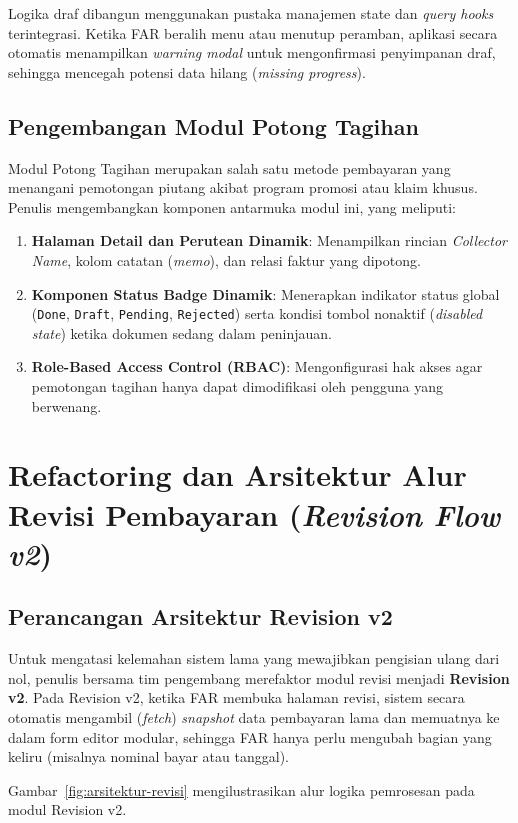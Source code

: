 Logika draf dibangun menggunakan pustaka manajemen state dan \textit{query hooks} terintegrasi. Ketika FAR beralih menu atau menutup peramban, aplikasi secara otomatis menampilkan \textit{warning modal} untuk mengonfirmasi penyimpanan draf, sehingga mencegah potensi data hilang (\textit{missing progress}).

\subsection{Pengembangan Modul Potong Tagihan}
Modul Potong Tagihan merupakan salah satu metode pembayaran yang menangani pemotongan piutang akibat program promosi atau klaim khusus. Penulis mengembangkan komponen antarmuka modul ini, yang meliputi:
\begin{enumerate}[label=\alph*)]
  \item \textbf{Halaman Detail dan Perutean Dinamik}: Menampilkan rincian \textit{Collector Name}, kolom catatan (\textit{memo}), dan relasi faktur yang dipotong.
  \item \textbf{Komponen Status Badge Dinamik}: Menerapkan indikator status global (\texttt{Done}, \texttt{Draft}, \texttt{Pending}, \texttt{Rejected}) serta kondisi tombol nonaktif (\textit{disabled state}) ketika dokumen sedang dalam peninjauan.
  \item \textbf{Role-Based Access Control (RBAC)}: Mengonfigurasi hak akses agar pemotongan tagihan hanya dapat dimodifikasi oleh pengguna yang berwenang.
\end{enumerate}

\section{Refactoring dan Arsitektur Alur Revisi Pembayaran (\textit{Revision Flow v2})}

\subsection{Perancangan Arsitektur Revision v2}
Untuk mengatasi kelemahan sistem lama yang mewajibkan pengisian ulang dari nol, penulis bersama tim pengembang merefaktor modul revisi menjadi \textbf{Revision v2}. Pada Revision v2, ketika FAR membuka halaman revisi, sistem secara otomatis mengambil (\textit{fetch}) \textit{snapshot} data pembayaran lama dan memuatnya ke dalam form editor modular, sehingga FAR hanya perlu mengubah bagian yang keliru (misalnya nominal bayar atau tanggal).

Gambar~\ref{fig:arsitektur-revisi} mengilustrasikan alur logika pemrosesan pada modul Revision v2.


